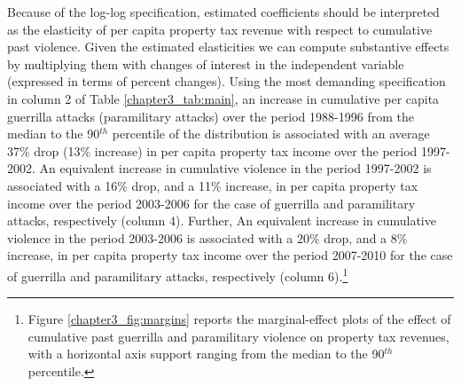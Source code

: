 Because of the log-log specification, estimated coefficients should be interpreted as the elasticity of per capita property tax revenue with respect to cumulative past violence. Given the estimated elasticities we can compute substantive effects by multiplying them with changes of interest in the independent variable (expressed in terms of percent changes). Using the most demanding specification in column 2 of Table \ref{chapter3_tab:main}, an increase in cumulative per capita guerrilla attacks (paramilitary attacks) over the period 1988-1996 from the median to the 90$^{th}$ percentile of the distribution is associated with an average 37\% drop (13\% increase) in per capita property tax income over the period 1997-2002. An equivalent increase in cumulative violence in the period 1997-2002 is associated with a 16\% drop, and a 11\% increase, in per capita property tax income over the period 2003-2006 for the case of guerrilla and paramilitary attacks, respectively (column 4). Further,  
An equivalent increase in cumulative violence in the period 2003-2006 is associated with a 20\% drop, and a 8\% increase, in per capita property tax income over the period 2007-2010 for the case of guerrilla and paramilitary attacks, respectively (column 6).\footnote{Figure \ref{chapter3_fig:margins} reports the marginal-effect plots of the effect of cumulative past guerrilla and paramilitary violence on property tax revenues, with a horizontal axis support ranging from the median to the 90$^{th}$ percentile.}

